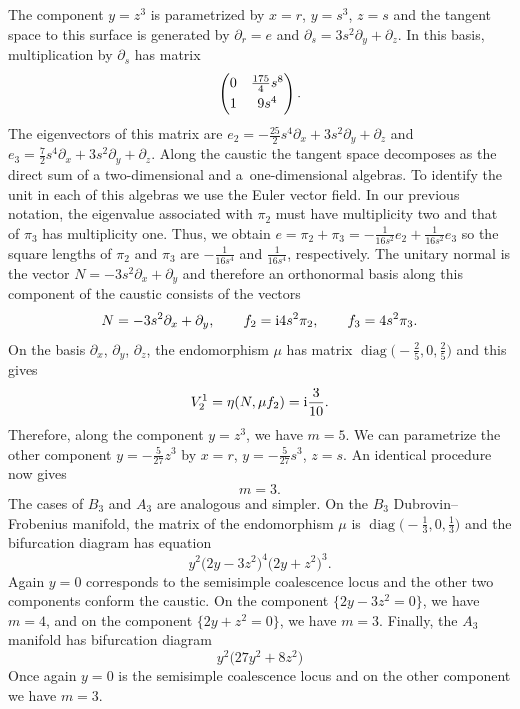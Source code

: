 \documentclass[10pt,a4paper]{amsart}
\numberwithin{equation}{section}
\begin{document}
The component $y=z^{3}$ is parametrized by $x=r$, $y=s^{3}$, $z=s$ and the tangent space to this surface is generated by $\partial_{r}=e$ and $\partial_{s}=3s^{2}\partial_{y}+\partial_{z}$. In this basis, multiplication by $\partial_{s}$ has matrix
\begin{equation*}
 \begin{pmatrix}
 0&\frac{175}{4}s^{8}\vspace{1mm}\\
 1& 9s^{4}
 \end{pmatrix}.
\end{equation*}
The eigenvectors of this matrix are $e_{2}=-\tfrac{25}{2}s^{4}\partial_{x}+3s^{2}\partial_{y}+\partial_{z}$ and $e_{3}=\frac{7}{2}s^{4}\partial_{x}+3s^{2}\partial_{y}+\partial_{z}$. Along the caustic the tangent space decomposes as the direct sum of a two-dimensional and a~one-dimensional algebras. To identify the unit in each of this algebras we use the Euler vector field. In our previous notation, the eigenvalue associated with $\pi_{2}$ must have multiplicity two and that of $\pi_{3}$ has multiplicity one. Thus, we obtain $e=\pi_{2}+\pi_{3}=-\frac{1}{16s^{2}}e_{2}+\frac{1}{16s^{2}}e_{3}$ so the square lengths of $\pi_{2}$ and $\pi_{3}$ are $-\frac{1}{16s^{4}}$ and $\frac{1}{16s^{4}}$, respectively. The unitary normal is the vector $N=-3s^{2}\partial_{x}+\partial_{y}$ and therefore an orthonormal basis along this component of the caustic consists of the vectors
\[
 N=-3s^{2}\partial_{x}+\partial_{y},\qquad
 f_{2}={\rm i}4s^{2}\pi_{2},\qquad
 f_{3}=4s^{2}\pi_{3}.
\]
On the basis $\partial_{x}$, $\partial_{y}$, $\partial_{z}$, the endomorphism $\mu$ has matrix $\operatorname{diag}\bigl(-\tfrac{2}{5},0,\tfrac{2}{5}\bigr)$ and this gives
\begin{equation*}
 V_{2}^{1}=\eta(N,\mu f_{2})={\rm i}\frac{3}{10}.
\end{equation*}
Therefore, along the component $y=z^{3}$, we have $m=5$. We can parametrize the other component $y=-\tfrac{5}{27}z^{3}$ by $x=r$, $y=-\tfrac{5}{27}s^{3}$, $z=s$. An identical procedure now gives
\begin{equation*}
 m=3.
\end{equation*}
The cases of $B_{3}$ and $A_{3}$ are analogous and simpler. On the $B_{3}$ Dubrovin--Frobenius manifold, the matrix of the endomorphism $\mu$ is $\operatorname{diag}\bigl(-\tfrac{1}{3},0,\tfrac{1}{3}\bigr)$ and the bifurcation diagram has equation
\begin{equation*}
 y^{2}\bigl(2y-3z^{2}\bigr)^{4}\bigl(2y+z^{2}\bigr)^{3}.
\end{equation*}
Again $y=0$ corresponds to the semisimple coalescence locus and the other two components conform the caustic. On the component $\big\{2y-3z^{2}=0 \big\}$, we have $m=4$, and on the component $\big\{2y+z^{2}=0 \big\}$, we have $m=3$. Finally, the $A_{3}$ manifold has bifurcation diagram
\begin{equation*}
 y^{2}\bigl(27y^{2}+8z^{2}\bigr)
\end{equation*}
Once again $y=0$ is the semisimple coalescence locus and on the other component we have $m=3$.
\end{document}
